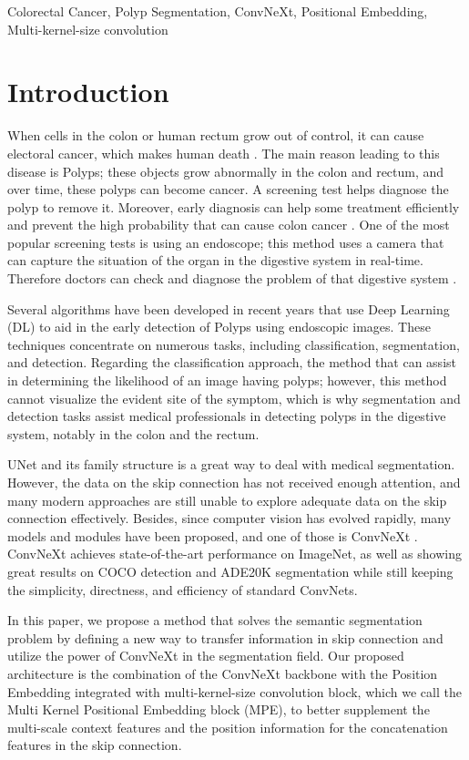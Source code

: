 \documentclass[conference]{IEEEtran}
\begin{document}
\begin{IEEEkeywords}
Colorectal Cancer, Polyp Segmentation, ConvNeXt, Positional Embedding, Multi-kernel-size convolution
\end{IEEEkeywords}

\section{Introduction}
When cells in the colon or human rectum grow out of control, it can cause electoral cancer, which makes human death \cite{colectoral}. The main reason leading to this disease is Polyps; these objects grow abnormally in the colon and rectum, and over time, these polyps can become cancer. A screening test helps diagnose the polyp to remove it. Moreover, early diagnosis can help some treatment efficiently and prevent the high probability that can cause colon cancer \cite{reason}. One of the most popular screening tests is using an endoscope; this method uses a camera that can capture the situation of the organ in the digestive system in real-time. Therefore doctors can check and diagnose the problem of that digestive system \cite{method_Cancer}.

Several algorithms have been developed in recent years that use Deep Learning (DL) to aid in the early detection of Polyps using endoscopic images. These techniques concentrate on numerous tasks, including classification, segmentation, and detection. Regarding the classification approach, the method that can assist in determining the likelihood of an image having polyps; however, this method cannot visualize the evident site of the symptom, which is why segmentation and detection tasks assist medical professionals in detecting polyps in the digestive system, notably in the colon and the rectum.

UNet and its family structure \cite{unet, unet++, resunet} is a great way to deal with medical segmentation. However, the data on the skip connection has not received enough attention, and many modern approaches are still unable to explore adequate data on the skip connection effectively. Besides, since computer vision has evolved rapidly, many models and modules have been proposed, and one of those is ConvNeXt \cite{convnet}. ConvNeXt achieves state-of-the-art performance on ImageNet, as well as showing great results on COCO detection and ADE20K segmentation while still keeping the simplicity, directness, and efficiency of standard ConvNets.

In this paper, we propose a method that solves the semantic segmentation problem by defining a new way to transfer information in skip connection and utilize the power of ConvNeXt in the segmentation field. Our proposed architecture is the combination of the ConvNeXt \cite{convnet} backbone with the Position Embedding \cite{position-embedding} integrated with multi-kernel-size convolution block, which we call the Multi Kernel Positional Embedding block (MPE), to better supplement the multi-scale context features and the position information for the concatenation features in the skip connection.
\end{document}
